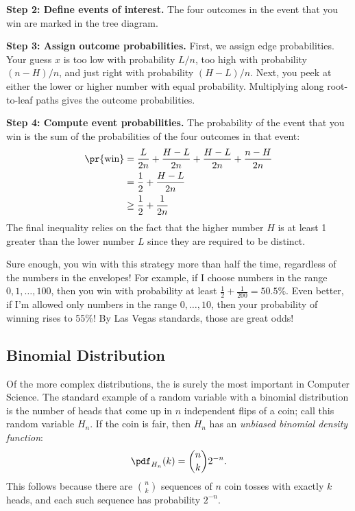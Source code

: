 \noindent \textbf{Step 2: Define events of interest. } The four
outcomes in the event that you win are marked in the tree diagram.

\noindent \textbf{Step 3: Assign outcome probabilities. } First, we
assign edge probabilities.  Your guess $x$ is too low with probability
$L/n$, too high with probability $(n-H)/n$, and just right with
probability $(H-L)/n$.  Next, you peek at either the lower or higher
number with equal probability.  Multiplying along root-to-leaf paths
gives the outcome probabilities.

\noindent \textbf{Step 4: Compute event probabilities. }  The
probability of the event that you win is the sum of the probabilities
of the four outcomes in that event:
%
\begin{align*}
\pr{\text{win}}
    & = \frac{L}{2n} + \frac{H-L}{2n} + \frac{H-L}{2n}  + \frac{n-H}{2n} \\
    & = \frac{1}{2} + \frac{H-L}{2n} \\
    & \geq \frac{1}{2} + \frac{1}{2n}
\end{align*}
%
The final inequality relies on the fact that the higher number $H$ is
at least 1 greater than the lower number $L$ since they are required
to be distinct.

Sure enough, you win with this strategy more than half the time,
regardless of the numbers in the envelopes!  For example, if I choose
numbers in the range $0, 1, \dots, 100$, then you win with probability at
least $\frac{1}{2} + \frac{1}{200} = 50.5\%$.  Even better, if I'm allowed
only numbers in the range $0, \dots, 10$, then your probability of
winning rises to 55\%!  By Las Vegas standards, those are great odds!
\fi

\subsection{Binomial Distribution}

Of the more complex distributions, the  is
surely the most important in Computer Science.  The standard example
of a random variable with a binomial distribution is the number of
heads that come up in $n$ independent flips of a coin; call this
random variable $H_n$.  If the coin is fair, then $H_n$ has an
\textit{unbiased binomial density function}:
%
\[
\pdf_{H_n}(k) = \binom{n}{k} 2^{-n}.
\]
%
This follows because there are $\binom{n}{k}$ sequences of $n$ coin
tosses with exactly $k$ heads, and each such sequence has probability
$2^{-n}$.


